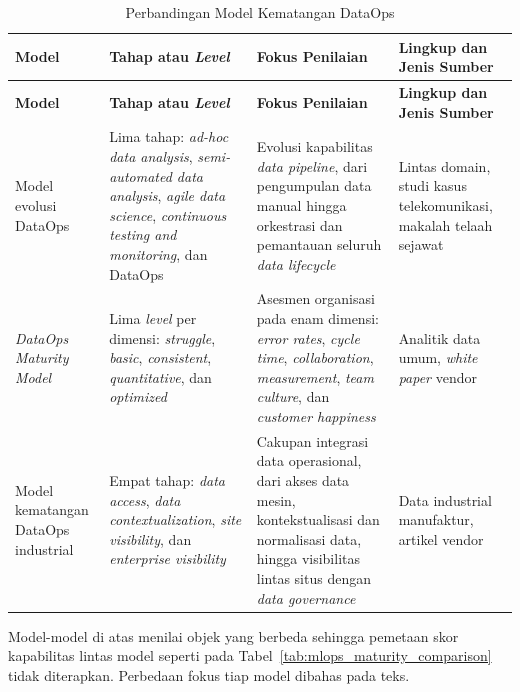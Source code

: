 {
\footnotesize
\setlength{\tabcolsep}{3pt}
\renewcommand{\arraystretch}{1.2}
\setlength{\LTpost}{0pt}
\begin{longtable}{|>{\raggedright\arraybackslash}m{2.8cm}|>{\raggedright\arraybackslash}m{4.4cm}|>{\raggedright\arraybackslash}m{3.4cm}|>{\raggedright\arraybackslash}m{2.4cm}|}
\caption{Perbandingan Model Kematangan DataOps}
\label{tab:dataops_maturity_comparison} \\
\hline
\centering\arraybackslash\textbf{Model} & \centering\arraybackslash\textbf{Tahap atau \textit{Level}} & \centering\arraybackslash\textbf{Fokus Penilaian} & \centering\arraybackslash\textbf{Lingkup dan Jenis Sumber} \\
\hline
\endfirsthead
\hline
\centering\arraybackslash\textbf{Model} & \centering\arraybackslash\textbf{Tahap atau \textit{Level}} & \centering\arraybackslash\textbf{Fokus Penilaian} & \centering\arraybackslash\textbf{Lingkup dan Jenis Sumber} \\
\hline
\endhead
\endfoot
\hline
\endlastfoot

Model evolusi DataOps \autocite{munappy2020adhoc} & Lima tahap: \textit{ad-hoc data analysis}, \textit{semi-automated data analysis}, \textit{agile data science}, \textit{continuous testing and monitoring}, dan DataOps & Evolusi kapabilitas \textit{data pipeline}, dari pengumpulan data manual hingga orkestrasi dan pemantauan seluruh \textit{data lifecycle} & Lintas domain, studi kasus telekomunikasi, makalah telaah sejawat \\
\hline
\textit{DataOps Maturity Model} \autocite{datakitchen2020maturity} & Lima \textit{level} per dimensi: \textit{struggle}, \textit{basic}, \textit{consistent}, \textit{quantitative}, dan \textit{optimized} & Asesmen organisasi pada enam dimensi: \textit{error rates}, \textit{cycle time}, \textit{collaboration}, \textit{measurement}, \textit{team culture}, dan \textit{customer happiness} & Analitik data umum, \textit{white paper} vendor \\
\hline
Model kematangan DataOps industrial \autocite{harrington2023highbyte} & Empat tahap: \textit{data access}, \textit{data contextualization}, \textit{site visibility}, dan \textit{enterprise visibility} & Cakupan integrasi data operasional, dari akses data mesin, kontekstualisasi dan normalisasi data, hingga visibilitas lintas situs dengan \textit{data governance} & Data industrial manufaktur, artikel vendor \\
\hline
\end{longtable}
\par{\footnotesize Model-model di atas menilai objek yang berbeda sehingga pemetaan skor kapabilitas lintas model seperti pada Tabel~\ref{tab:mlops_maturity_comparison} tidak diterapkan. Perbedaan fokus tiap model dibahas pada teks.}
}
